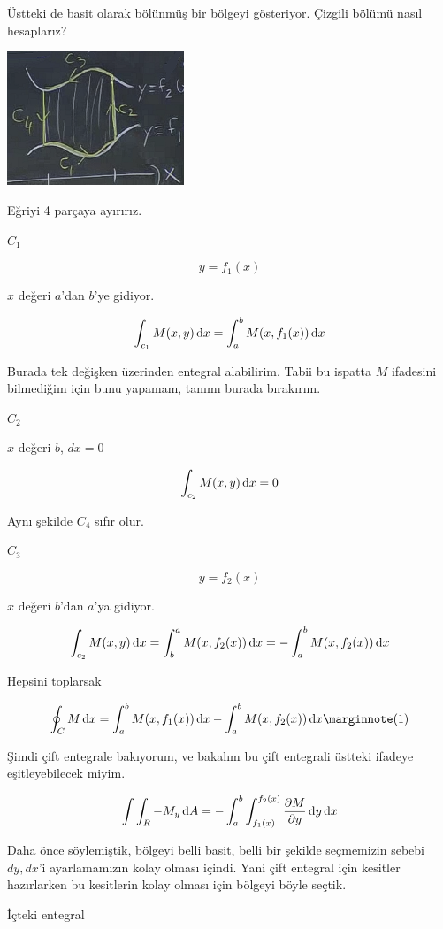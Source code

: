 \documentclass[12pt,fleqn]{article}\usepackage{../../common}
\begin{document}
Üstteki de basit olarak bölünmüş bir bölgeyi gösteriyor. Çizgili bölümü
nasıl hesaplarız?

\begin{center}
\includegraphics[height=4cm]{22_8.png}
\end{center}

Eğriyi 4 parçaya ayırırız. 

$C_1$

$$ y = f_1(x) $$

$x$ değeri $a$'dan $b$'ye gidiyor. 

$$ \int_{c_1}M(x,y) \,\mathrm{d} x = \int_a^b M(x,f_1(x)) \,\mathrm{d} x$$

Burada tek değişken üzerinden entegral alabilirim. Tabii bu ispatta $M$
ifadesini bilmediğim için bunu yapamam, tanımı burada bırakırım. 

$C_2$

$x$ değeri $b$, $dx = 0$

$$ \int_{c_2}M(x,y) \,\mathrm{d} x = 0$$

Aynı şekilde $C_4$ sıfır olur. 

$C_3$

$$ y = f_2(x) $$

$x$ değeri $b$'dan $a$'ya gidiyor. 

$$
\int_{c_2}M(x,y) \,\mathrm{d} x = \int_b^a M(x,f_2(x)) \,\mathrm{d} x = - \int_a^b M(x,f_2(x)) \,\mathrm{d} 
x 
$$

Hepsini toplarsak

$$
\oint_C M \ud x  =
\int_a^b M(x,f_1(x)) \ud x - \int_a^b M(x,f_2(x)) \ud x 
\mlabel{1}
$$

Şimdi çift entegrale bakıyorum, ve bakalım bu çift entegrali üstteki
ifadeye eşitleyebilecek miyim. 

$$
\int \int_R -M_y \,\mathrm{d} A
= - \int_a^b \int_{f_1(x)}^{f_2(x)} \frac{\partial M}{\partial y} \,\mathrm{d} y \,\mathrm{d} x
$$

Daha önce söylemiştik, bölgeyi belli basit, belli bir şekilde seçmemizin
sebebi $dy,dx$'i ayarlamamızın kolay olması içindi. Yani çift entegral için
kesitler hazırlarken bu kesitlerin kolay olması için bölgeyi böyle
seçtik. 

İçteki entegral
\end{document}
